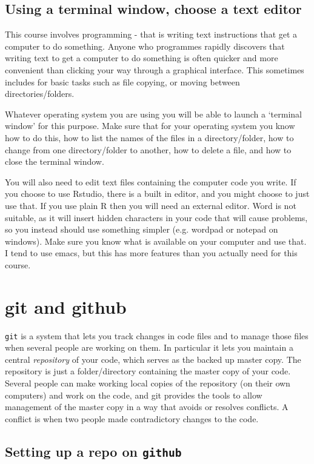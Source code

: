 \documentclass[10pt] {article}
\theoremstyle{definition}
\begin{document}
\subsection{Using a terminal window, choose a text editor}

This course involves programming - that is writing text instructions that get a computer to do something. Anyone who programmes rapidly discovers that writing text to get a computer to do something is often quicker and more convenient than clicking your way through a graphical interface. This sometimes includes for basic tasks such as file copying, or moving between directories/folders. 

Whatever operating system you are using you will be able to launch a `terminal window' for this purpose. Make sure that for your operating system you know how to do this, how to list the names of the files in a directory/folder, how to change from one directory/folder to another, how to delete a file, and how to close the terminal window. 

You will also need to edit text files containing the computer code you write. If you choose to use Rstudio, there is a built in editor, and you might choose to just use that. If you use plain R then you will need an external editor. Word is not suitable, as it will insert hidden characters in your code that will cause problems, so you instead should use something simpler (e.g. wordpad or notepad on windows). Make sure you know what is available on your computer and use that. I tend to use emacs, but this has more features than you actually need for this course. 

\section{git and github}

{\tt git} is a system that lets you track changes in code files and to manage those files when several people are working on them. In particular it lets you maintain a central {\em repository} of your code, which serves as the backed up master copy. The repository is just a folder/directory containing the master copy of your code. Several people can make working local copies of the repository (on their own computers) and work on the code, and git provides the tools to allow management of the master copy in a way that avoids or resolves conflicts. A conflict is when two people made contradictory changes to the code. 

\subsection{Setting up a repo on {\tt github}}
\end{document}
